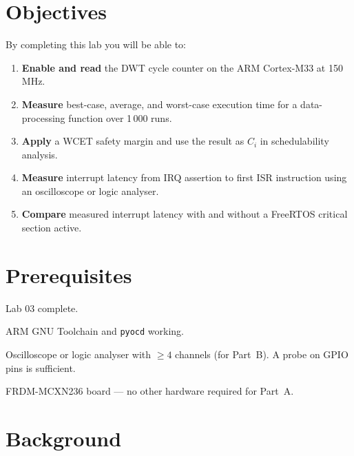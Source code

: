 \documentclass[11pt, a4paper]{article}
\begin{document}

\section{Objectives}

By completing this lab you will be able to:

\begin{enumerate}[noitemsep, leftmargin=*]
  \item \textbf{Enable and read} the DWT cycle counter on the ARM Cortex-M33 at
        150\,MHz.
  \item \textbf{Measure} best-case, average, and worst-case execution time for a
        data-processing function over 1\,000 runs.
  \item \textbf{Apply} a WCET safety margin and use the result as $C_i$ in
        schedulability analysis.
  \item \textbf{Measure} interrupt latency from IRQ assertion to first ISR instruction
        using an oscilloscope or logic analyser.
  \item \textbf{Compare} measured interrupt latency with and without a FreeRTOS critical
        section active.
\end{enumerate}

\section{Prerequisites}

\begin{checklist}
  \item Lab 03 complete.
  \item ARM GNU Toolchain and \texttt{pyocd} working.
  \item Oscilloscope or logic analyser with $\geq 4$ channels (for Part~B). A probe on
        GPIO pins is sufficient.
  \item FRDM-MCXN236 board --- no other hardware required for Part~A.
\end{checklist}

\section{Background}
\end{document}
